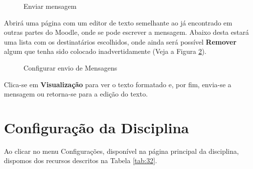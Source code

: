 \begin{figure}[htbp]
 \begin{center}
  \caption{Enviar mensagem}
  \label{fig:enviarMensagem}
 \end{center}
\end{figure}
Abrirá uma página com um editor de texto semelhante ao já encontrado em outras partes do Moodle, onde se pode escrever a mensagem. Abaixo desta estará uma lista com os destinatários escolhidos, onde ainda será possível \textbf{Remover} algum que tenha sido colocado inadvertidamente (Veja a Figura \ref{fig:confEnvio}).

\begin{figure}[htbp]
 \begin{center}
  \caption{Configurar envio de Mensagens}
  \label{fig:confEnvio}
 \end{center}
\end{figure}

Clica-se em \textbf{Visualização} para ver o texto formatado e, por fim, envia-se a mensagem ou retorna-se para a edição do texto.


\section{Configuração da Disciplina}

Ao clicar no menu Configurações, disponível na página principal da disciplina, dispomos dos recursos descritos na Tabela \ref{tab:32}.



